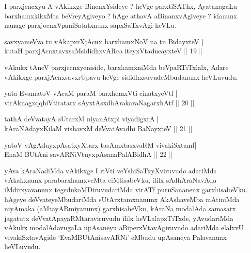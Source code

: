 \begin{artha}
I parxjencxyu A vAkikxge BinenxYsideye ? heVge parxtiSAThx, AyatanagaLu barxhamxkikxMta beVreyAgiveyo ? hAge athavA aBinanxvAgiveye ? idanunx nanage parxjocnxVpaniSatatxnunx sapxSaTxvAgi heVLu.
\end{artha}


\begin{shl}
savxyameVva tu vAkapxrXjAcnx barxhamxNoV na tu BidayxteV |\\
kutaH parxjAcnxtavxsaMsididhxvARca iteyxVtaducayxteV \hfill || 19 || 
\end{shl}

\begin{artha}
vAkukx tAneV parxjecnxyeniside, barxhamxniMda beVpaRTiTxlalx, Adare vAkikxge parxjAcnxsavxrUpavu heVge sididhxsuvudeMbudanunx heVLuvudu.
\end{artha}


\begin{shl}
yata EvamatoV vAcaM paraM barxhemxVti cinatxyeVtf |\\
virAknagxqqhiVtiratarx sAyxtAsxdhArakaraNagarxhAtf \hfill || 20 || 
\end{shl}

\begin{shl}
tathA deVvatayA sUtarxM niyanAtx\s pi viyadigxrA |\\
kAraNAdayxKilaM vishavxM deVvatAvadhi BaNayxteV \hfill || 21 || 
\end{shl}

\begin{shl}
yatoV vAgAduyxpAsatxyXtarx tasAmxtasxvaRM vivakiSxtamf|\\
EnaM BUtAni savARNiVtuyxpAsanaPalABidhA \hfill || 22 || 
\end{shl}

\begin{artha}
yAva kAraNadiMda vAkikxge I riVti veYshiSaTxyXviruvudo adariMda vAkakxnunx parabarxhamxveMta ciMtisabeVku, ililx sAdhAraNavAda iMdirxyavanunx tegedukoMDiruvudariMda virATf puruSananenx garxhisabeVku. hAgeye deVvateyeMbudariMda sUtArxtamxnanunx AkAshaveMba mAtiniMda niyAmaka (aMtayARmiyanunx) garxhisabeVku, kAraNa modalAda samasatx jagatutx deVvatApayaRMtaraviruvudu ililx heVLalapxTiTxde, yAvudariMda vAkukx modalAdavugaLa upAsaneyu aBiperxVtavAgiruvudo adariMda elalxvU vivakiSxtavAgide `EvaMBUtAnisavARNi' eMbudu upAsaneya Palavanunx heVLuvudu.
\end{artha}

